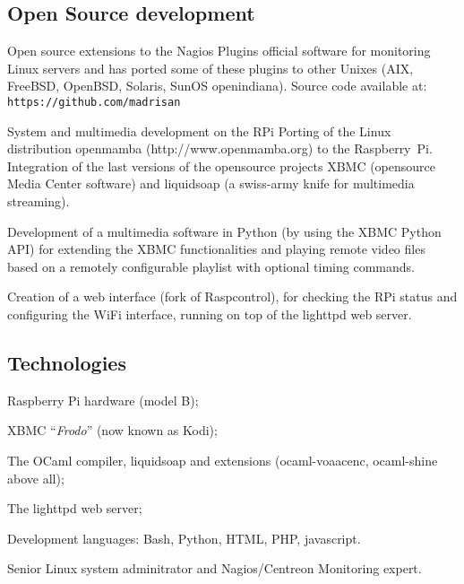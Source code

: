 \subsection{Open Source development}

\noindent
Open source extensions to the 
Nagios Plugins official software for monitoring Linux servers and has ported
some of these plugins to other Unixes (AIX, FreeBSD, OpenBSD, Solaris, 
SunOS openindiana).
Source code available at: {\tt https://github.com/madrisan}


\bigskip
{}
   {System and multimedia development on the RPi}
Porting of the Linux distribution openmamba 
({\rm http:/\negthinspace/www.openmamba.org}) to the Raspberry~Pi.
Integration of the last versions of the opensource projects XBMC 
(opensource Media Center software) and liquidsoap 
(a swiss-army knife for multimedia streaming).

Development of a multimedia software in Python (by using the XBMC Python API)
for extending the XBMC functionalities and playing remote video files based on
a remotely configurable playlist with optional timing commands.

Creation of a web interface (fork of Raspcontrol), for checking the RPi status
and configuring the WiFi interface, running on top of the lighttpd web server.

\subsection{Technologies}

\item{\bdot} Raspberry Pi hardware (model B);
\item{\bdot} XBMC ``{\it Frodo\/}'' (now known as Kodi);
\item{\bdot} The OCaml compiler, liquidsoap and extensions
             (ocaml-voaacenc, ocaml-shine above all);
\item{\bdot} The lighttpd web server;
\item{\bdot} Development languages: Bash, Python, HTML, PHP, javascript.


\bigskip
{}
Senior Linux system adminitrator and Nagios/Centreon Monitoring expert.

